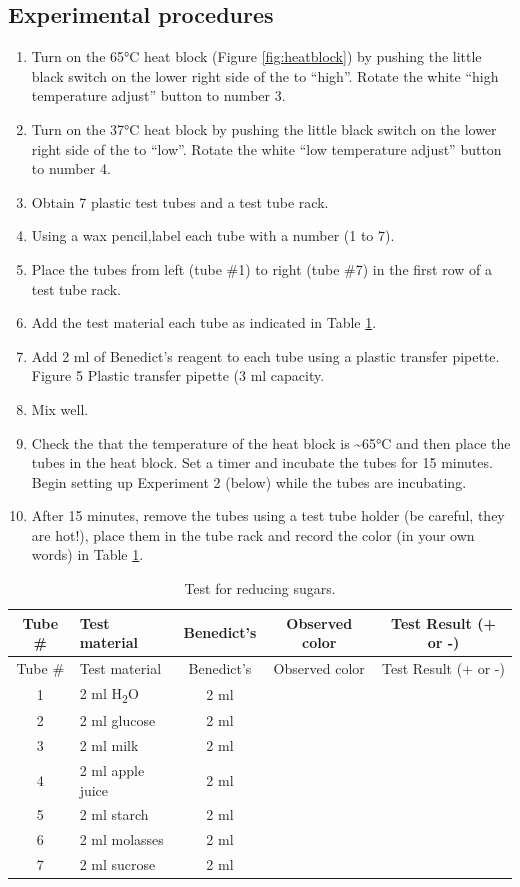 \subsection{Experimental procedures}\label{experimental-procedures-1}

\begin{enumerate}
\def\labelenumi{\arabic{enumi}.}
\tightlist
\item
  Turn on the 65°C heat block (Figure \ref{fig:heatblock}) by pushing
  the little black switch on the lower right side of the to ``high''.
  Rotate the white ``high temperature adjust'' button to number 3.
\item
  Turn on the 37°C heat block by pushing the little black switch on the
  lower right side of the to ``low''. Rotate the white ``low temperature
  adjust'' button to number 4.
\item
  Obtain 7 plastic test tubes and a test tube rack.
\item
  Using a wax pencil,label each tube with a number (1 to 7).
\item
  Place the tubes from left (tube \#1) to right (tube \#7) in the first
  row of a test tube rack.
\item
  Add the test material each tube as indicated in Table \ref{tab:sugar}.
\item
  Add 2 ml of Benedict's reagent to each tube using a plastic transfer
  pipette. Figure 5 Plastic transfer pipette (3 ml capacity.
\item
  Mix well.
\item
  Check the that the temperature of the heat block is
  \textasciitilde{}65°C and then place the tubes in the heat block. Set
  a timer and incubate the tubes for 15 minutes. Begin setting up
  Experiment 2 (below) while the tubes are incubating.
\item
  After 15 minutes, remove the tubes using a test tube holder (be
  careful, they are hot!), place them in the tube rack and record the
  color (in your own words) in Table \ref{tab:sugar}.
\end{enumerate}

\begin{longtable}[]{@{}clccc@{}}
\caption{\label{tab:sugar} Test for reducing sugars.}\tabularnewline
\toprule
Tube \# & Test material & Benedict's & Observed color & Test Result (+
or -)\tabularnewline
\midrule
\endfirsthead
\toprule
Tube \# & Test material & Benedict's & Observed color & Test Result (+
or -)\tabularnewline
\midrule
\endhead
1 & 2 ml H\textsubscript{2}O & 2 ml & &\tabularnewline
2 & 2 ml glucose & 2 ml & &\tabularnewline
3 & 2 ml milk & 2 ml & &\tabularnewline
4 & 2 ml apple juice & 2 ml & &\tabularnewline
5 & 2 ml starch & 2 ml & &\tabularnewline
6 & 2 ml molasses & 2 ml & &\tabularnewline
7 & 2 ml sucrose & 2 ml & &\tabularnewline
\bottomrule
\end{longtable}

